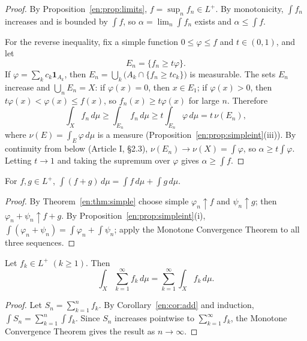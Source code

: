 \documentclass[11pt]{article}
\makeatletter
\newcommand{\envlabel}[1]{\protected@edef\@currentlabel{\themathenv}\label{#1}}
\makeatother
\begin{document}
\begin{proof}
By Proposition~\ref{en:prop:limits}, $f=\sup_{n}f_{n}\in L^{+}$. By monotonicity, $\int f_{n}$ increases and is bounded by $\int f$, so $\alpha=\lim_{n}\int f_{n}$ exists and $\alpha\leq\int f$.

For the reverse inequality, fix a simple function $0\leq\varphi\leq f$ and $t\in(0,1)$, and let
\[
E_{n}=\{f_{n}\geq t\varphi\}.
\]
If $\varphi=\sum_{k}c_{k}\mathbf{1}_{A_{k}}$, then $E_{n}=\bigcup_{k}\big(A_{k}\cap\{f_{n}\geq tc_{k}\}\big)$ is measurable. The sets $E_{n}$ increase and $\bigcup_{n}E_{n}=X$: if $\varphi(x)=0$, then $x\in E_{1}$; if $\varphi(x)>0$, then $t\varphi(x)<\varphi(x)\leq f(x)$, so $f_{n}(x)\geq t\varphi(x)$ for large $n$. Therefore
\[
\int_{X}f_{n}\,d\mu\geq\int_{E_{n}}f_{n}\,d\mu\geq t\int_{E_{n}}\varphi\,d\mu=t\,\nu(E_{n}),
\]
where $\nu(E)=\int_{E}\varphi\,d\mu$ is a measure (Proposition~\ref{en:prop:simpleint}(iii)). By continuity from below (Article I, \S2.3), $\nu(E_{n})\to\nu(X)=\int\varphi$, so $\alpha\geq t\int\varphi$. Letting $t\to1$ and taking the supremum over $\varphi$ gives $\alpha\geq\int f$.
\end{proof}

\begin{corollary}[Additivity]\envlabel{en:cor:add}
For $f,g\in L^{+}$, $\int(f+g)\,d\mu=\int f\,d\mu+\int g\,d\mu$.
\end{corollary}

\begin{proof}
By Theorem~\ref{en:thm:simple} choose simple $\varphi_{n}\uparrow f$ and $\psi_{n}\uparrow g$; then $\varphi_{n}+\psi_{n}\uparrow f+g$. By Proposition~\ref{en:prop:simpleint}(i), $\int(\varphi_{n}+\psi_{n})=\int\varphi_{n}+\int\psi_{n}$; apply the Monotone Convergence Theorem to all three sequences.
\end{proof}

\begin{corollary}\envlabel{en:cor:series}
Let $f_{k}\in L^{+}$ $(k\geq1)$. Then
\[
\int_{X}\sum_{k=1}^{\infty}f_{k}\,d\mu=\sum_{k=1}^{\infty}\int_{X}f_{k}\,d\mu.
\]
\end{corollary}

\begin{proof}
Let $S_{n}=\sum_{k=1}^{n}f_{k}$. By Corollary~\ref{en:cor:add} and induction, $\int S_{n}=\sum_{k=1}^{n}\int f_{k}$. Since $S_{n}$ increases pointwise to $\sum_{k=1}^{\infty}f_{k}$, the Monotone Convergence Theorem gives the result as $n\to\infty$.
\end{proof}
\end{document}
